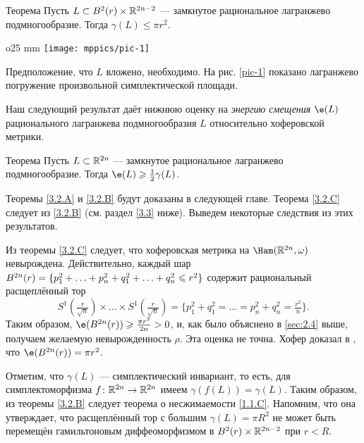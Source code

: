 \begin{thm}[(\cite{S1})]{Теорема}\label{3.2.B}
  Пусть $L \subset B^2 (r) \times \mathbb{R}^{2n - 2}$ --- замкнутое
  рациональное лагранжево подмногообразие. 
  Тогда $\gamma (L) \le \pi r^2$.
\end{thm}

\begin{wrapfigure}[7]{o}{25 mm}
\vskip-3mm
\centering
\texttt{[image: mppics/pic-1]}
\caption{}\label{pic-1}
\vskip0mm
\end{wrapfigure}

Предположение, что $L$ вложено, необходимо.
На рис. \ref{pic-1} показано лагранжево погружение произвольной
симплектической площади.

Наш следующий результат даёт нижнюю оценку на \emph{энергию смещения} $\e (L)$ рационального лагранжева подмногообразия $L$ относительно хоферовской метрики.

\begin{thm}{Теорема}\label{3.2.C}
  Пусть $L \subset \mathbb{R}^{2n}$ --- замкнутое рациональное лагранжево
  подмногообразие.
  Тогда $\e (L) \ge \tfrac12 \gamma (L)$.
\end{thm}

Теоремы \ref{3.2.A} и \ref{3.2.B} будут доказаны в следующей главе.
Теорема \ref{3.2.C} следует из \ref{3.2.B} (см. раздел \ref{3.3} ниже).
Выведем некоторые следствия из этих результатов.

\begin{ex}{}\label{3.2.D}
Из теоремы \ref{3.2.C} следует, что хоферовская метрика на $\Ham (\RR^{2n}, \omega)$ невырождена.
Действительно, каждый шар 
$B^{2n}(r) = \{p_1^2 +\z\dots\z+ p_n^2 \z+ q_1^2+\z\dots\z+ q_n^2 \le r^2\}$
содержит рациональный расщеплённый тор 
\[
S^1(\tfrac r{\sqrt{n}}) \times\dots\times S^1(\tfrac r{\sqrt{n}})
=
\{p_1^{2}+q_1^2=\dots=p_n^{2}+q_n^2=\tfrac{r^2}{n}\}.
\]
Таким образом, $\e (B^{2n} (r)) \ge \tfrac{\pi r^2}{2n}> 0$, и, как было объяснено в \ref{sec:2.4} выше, получаем желаемую невырожденность $\rho$.
Эта оценка не точна.
Хофер доказал в \cite{H1}, что $\e (B^{2n} (r)) = \pi r^2$.
\end{ex}

\begin{ex}{}\label{3.2.E}
Отметим, что $\gamma (L)$ --- симплектический инвариант, то есть, для симплектоморфизма $f\colon \mathbb{R}^{2n} \to \mathbb{R}^{2n}$ имеем $\gamma (f (L)) = \gamma (L)$.
Таким образом, из теоремы \ref{3.2.B} следует теорема о несжимаемости \ref{1.1.C}.
Напомним, что она утверждает, что расщеплённый тор с большим $\gamma (L) = \pi R^2$ не может быть перемещён гамильтоновым диффеоморфизмом в $B^2 (r) \times \mathbb{R}^{2n - 2}$ при $r<R$.
\end{ex}

